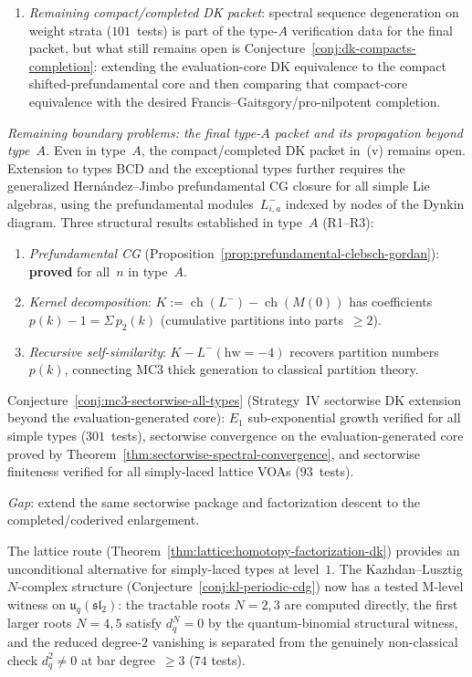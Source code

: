 \begin{remark}
\begin{enumerate}[label=\textup{(\roman*)},nosep]
\item \emph{Remaining compact/completed DK packet}: spectral sequence
 degeneration on weight strata ($101$~tests) is part of the
 type-$A$ verification data for the final packet, but what still remains open
 is Conjecture~\ref{conj:dk-compacts-completion}: extending the
 evaluation-core DK equivalence to the compact shifted-prefundamental
 core and then comparing that compact-core equivalence with the
 desired Francis--Gaitsgory/pro-nilpotent completion.
\end{enumerate}

\emph{Remaining boundary problems: the final type-$A$ packet and its
propagation beyond type~$A$.}
Even in type~$A$, the compact/completed DK packet in~(v) remains
open. Extension to types BCD and the exceptional types further requires the
generalized Hern\'andez--Jimbo prefundamental CG closure for
all simple Lie algebras, using the prefundamental
modules~$L^-_{i,a}$ indexed by nodes of the Dynkin diagram.
Three structural results established in type~$A$ (R1--R3):
 \begin{enumerate}[label=\textup{(R\arabic*)},nosep]
 \item \emph{Prefundamental CG}
 (Proposition~\ref{prop:prefundamental-clebsch-gordan}):
 \textbf{proved} for all~$n$ in type~$A$.
 \item \emph{Kernel decomposition}:
 $K := \operatorname{ch}(L^-) - \operatorname{ch}(M(0))$
 has coefficients~$p(k)-1 = \Sigma\, p_2(k)$
 (cumulative partitions into parts~$\geq 2$).
 \item \emph{Recursive self-similarity}:
 $K - L^-(\text{hw}=-4)$ recovers partition numbers~$p(k)$,
 connecting MC3 thick generation to classical partition theory.
 \end{enumerate}

Conjecture~\ref{conj:mc3-sectorwise-all-types} \textup{(}Strategy~IV
sectorwise DK extension beyond the evaluation-generated core\textup{)}:
$E_1$ sub-exponential growth verified for all simple types
($301$~tests), sectorwise convergence on the evaluation-generated
core proved by
Theorem~\ref{thm:sectorwise-spectral-convergence}, and sectorwise
finiteness verified for all simply-laced lattice VOAs
($93$~tests).

\emph{Gap}: extend the same sectorwise package and factorization
descent to the completed/coderived enlargement.

The lattice route
\textup{(}Theorem~\ref{thm:lattice:homotopy-factorization-dk}\textup{)}
provides an unconditional alternative for simply-laced types at
level~$1$. The Kazhdan--Lusztig $N$-complex structure
\textup{(}Conjecture~\ref{conj:kl-periodic-cdg}\textup{)} now has a
tested M-level witness on
$\mathfrak{u}_q(\mathfrak{sl}_2)$: the tractable roots
$N=2,3$ are computed directly, the first larger roots $N=4,5$ satisfy
$d_q^N=0$ by the quantum-binomial structural witness, and the
reduced degree-$2$ vanishing is separated from the genuinely
non-classical check $d_q^2\neq0$ at bar degree~$\ge3$
\textup{(}$74$ tests\textup{)}.


\end{remark}
